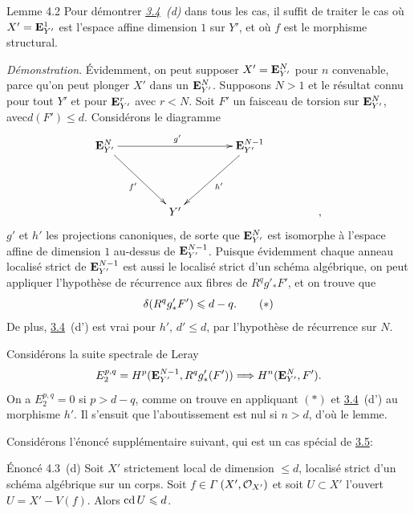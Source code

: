 \documentclass[10pt]{../fichiers-configuration-latex/smfart}
\begin{document}
\begin{enonce*}{Lemme 4.2}
Pour démontrer \emph{\hyperref[XIV.cor3.4]{3.4}~(d)} dans tous les cas, il suffit de traiter
le cas où $X'=\mathbf{E}^{1}_{Y'}$ est l'espace affine dimension $1$
sur $Y'$, et où $f$ est le morphisme structural.
\end{enonce*}

\noindent
\emph{Démonstration}. Évidemment, on peut supposer
$X'=\mathbf{E}^{N}_{Y'}$ pour $n$ convenable, parce qu'on peut plonger
$X'$ dans un $\mathbf{E}^{N}_{Y'}$. Supposons $N>1$ et le résultat
connu pour tout $Y'$ et pour $\mathbf{E}^{r}_{Y'}$ avec $r<N$. Soit
$F'$ un faisceau de torsion sur $\mathbf{E}^{N}_{Y'}$,
avec\pageoriginale $d(F')\leq d$. Considérons le diagramme
$$
\xymatrix@=1.5cm{
\EE^{N}_{Y'} \ar[rd]_{f'}       \ar[rr]^{g'}&      &
\EE^{N-1}_{Y'} \ar[ld]^{h'}\\
                       & Y' & &,
}
$$
$g'$ et $h'$ les projections canoniques, de sorte que
$\mathbf{E}^{N}_{Y'}$ est isomorphe à l'espace affine de dimension $1$
au-dessus de $\mathbf{E}^{N-1}_{Y'}$. Puisque évidemment chaque anneau
localisé strict de $\mathbf{E}^{N-1}_{Y'}$ est aussi le localisé
strict d'un schéma algébrique, on peut appliquer l'hypothèse de
récurrence aux fibres de $R^{q}g'_{\ast}F'$, et on trouve que
\begin{equation*}
\delta(R^{q}g'_{\ast}F')\leqslant d-q{}.\tag{$\ast$}
\end{equation*}
De plus, \hyperref[XIV.cor3.4]{3.4}~(d') est vrai pour $h'$, $d'\leq d$, par
l'hypothèse de récurrence sur $N$.

Considérons la suite spectrale de Leray
$$
E^{p,q}_2=H^{p}(\mathbf{E}^{N-1}_{Y'}, R^{q}
g'_{\ast}(F'))\Longrightarrow H^{n}(\mathbf{E}^{N}_{Y'}, F'){}.
$$
On a $E^{p,q}_2=0$ si $p>d-q$, comme on trouve en appliquant $(\ast)$
et \hyperref[XIV.cor3.4]{3.4}~(d') au morphisme $h'$. Il s'ensuit que l'aboutissement
est nul si $n>d$, d'où le lemme.

Considérons l'énoncé supplémentaire suivant, qui est un cas spécial de \hyperref[XIV.cor3.5]{3.5}:

\begin{enonce*}{Énoncé 4.3~(d)}
Soit $X'$ strictement local de dimension $\leq d$, localisé strict
d'un schéma algébrique sur un corps. Soit $f\in \Gamma$
$(X',{\mathcal O}_{X'})$ et soit $U\subset X'$ l'ouvert $U=X'-V(f)$. 
Alors $\operatorname{cd} U\leqslant d$.
\end{enonce*}
\end{document}
